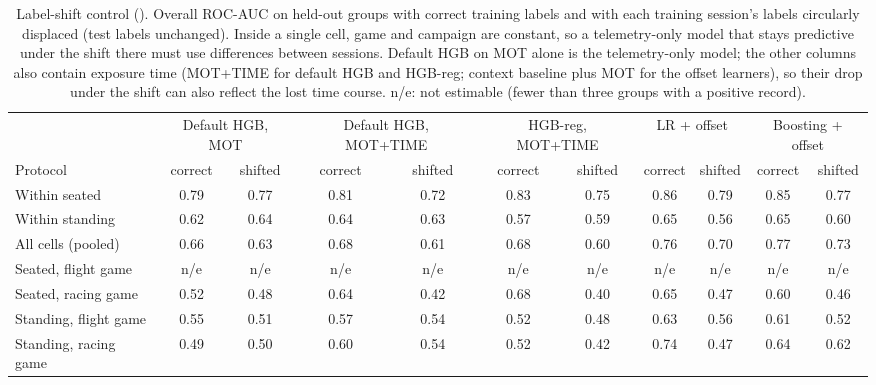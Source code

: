 \begin{table}[t]
\centering
\footnotesize
\caption{Label-shift control (\sevtwo{}). Overall ROC-AUC on held-out groups with correct training labels and with each training session's labels circularly displaced (test labels unchanged). Inside a single cell, game and campaign are constant, so a telemetry-only model that stays predictive under the shift there must use differences between sessions. Default HGB on MOT alone is the telemetry-only model; the other columns also contain exposure time (MOT+TIME for default HGB and HGB-reg; context baseline plus MOT for the offset learners), so their drop under the shift can also reflect the lost time course. n/e: not estimable (fewer than three groups with a positive record).}
\label{tab:control}
\setlength{\tabcolsep}{2.5pt}
\begin{tabular}{@{}lcccccccccc@{}}
\toprule
 & \multicolumn{2}{c}{Default HGB, MOT} & \multicolumn{2}{c}{Default HGB, MOT+TIME} & \multicolumn{2}{c}{HGB-reg, MOT+TIME} & \multicolumn{2}{c}{LR + offset} & \multicolumn{2}{c}{Boosting + offset} \\
\cmidrule(lr){2-3}\cmidrule(lr){4-5}\cmidrule(lr){6-7}\cmidrule(lr){8-9}\cmidrule(lr){10-11}
Protocol & correct & shifted & correct & shifted & correct & shifted & correct & shifted & correct & shifted \\
\midrule
Within seated & 0.79 & 0.77 & 0.81 & 0.72 & 0.83 & 0.75 & 0.86 & 0.79 & 0.85 & 0.77 \\
Within standing & 0.62 & 0.64 & 0.64 & 0.63 & 0.57 & 0.59 & 0.65 & 0.56 & 0.65 & 0.60 \\
All cells (pooled) & 0.66 & 0.63 & 0.68 & 0.61 & 0.68 & 0.60 & 0.76 & 0.70 & 0.77 & 0.73 \\
Seated, flight game & n/e & n/e & n/e & n/e & n/e & n/e & n/e & n/e & n/e & n/e \\
Seated, racing game & 0.52 & 0.48 & 0.64 & 0.42 & 0.68 & 0.40 & 0.65 & 0.47 & 0.60 & 0.46 \\
Standing, flight game & 0.55 & 0.51 & 0.57 & 0.54 & 0.52 & 0.48 & 0.63 & 0.56 & 0.61 & 0.52 \\
Standing, racing game & 0.49 & 0.50 & 0.60 & 0.54 & 0.52 & 0.42 & 0.74 & 0.47 & 0.64 & 0.62 \\
\bottomrule
\end{tabular}
\end{table}